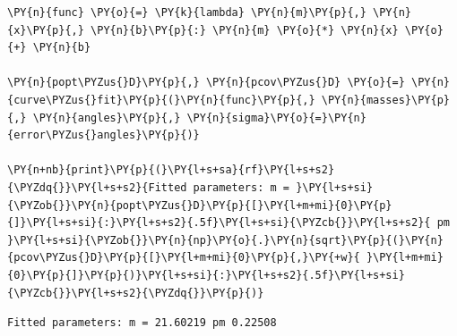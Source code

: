     \begin{tcolorbox}[breakable, size=fbox, boxrule=1pt, pad at break*=1mm,colback=cellbackground, colframe=cellborder]
\begin{Verbatim}[commandchars=\\\{\}]
\PY{n}{func} \PY{o}{=} \PY{k}{lambda} \PY{n}{m}\PY{p}{,} \PY{n}{x}\PY{p}{,} \PY{n}{b}\PY{p}{:} \PY{n}{m} \PY{o}{*} \PY{n}{x} \PY{o}{+} \PY{n}{b}

\PY{n}{popt\PYZus{}D}\PY{p}{,} \PY{n}{pcov\PYZus{}D} \PY{o}{=} \PY{n}{curve\PYZus{}fit}\PY{p}{(}\PY{n}{func}\PY{p}{,} \PY{n}{masses}\PY{p}{,} \PY{n}{angles}\PY{p}{,} \PY{n}{sigma}\PY{o}{=}\PY{n}{error\PYZus{}angles}\PY{p}{)}

\PY{n+nb}{print}\PY{p}{(}\PY{l+s+sa}{rf}\PY{l+s+s2}{\PYZdq{}}\PY{l+s+s2}{Fitted parameters: m = }\PY{l+s+si}{\PYZob{}}\PY{n}{popt\PYZus{}D}\PY{p}{[}\PY{l+m+mi}{0}\PY{p}{]}\PY{l+s+si}{:}\PY{l+s+s2}{.5f}\PY{l+s+si}{\PYZcb{}}\PY{l+s+s2}{ pm }\PY{l+s+si}{\PYZob{}}\PY{n}{np}\PY{o}{.}\PY{n}{sqrt}\PY{p}{(}\PY{n}{pcov\PYZus{}D}\PY{p}{[}\PY{l+m+mi}{0}\PY{p}{,}\PY{+w}{ }\PY{l+m+mi}{0}\PY{p}{]}\PY{p}{)}\PY{l+s+si}{:}\PY{l+s+s2}{.5f}\PY{l+s+si}{\PYZcb{}}\PY{l+s+s2}{\PYZdq{}}\PY{p}{)}
\end{Verbatim}
\end{tcolorbox}

    \begin{Verbatim}[commandchars=\\\{\}]
Fitted parameters: m = 21.60219 pm 0.22508
    \end{Verbatim}


